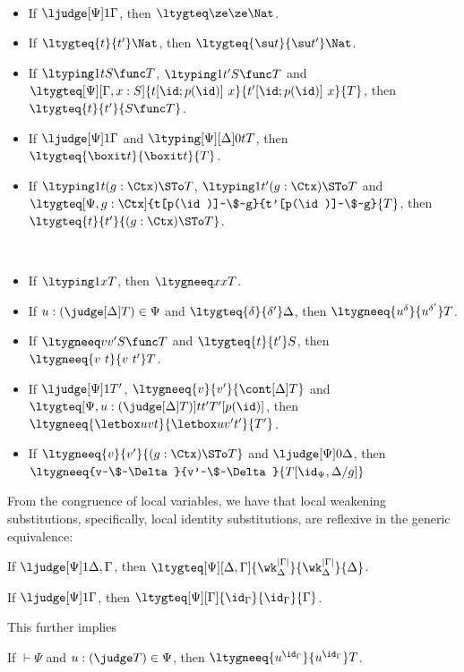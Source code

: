 \begin{law}[Congruence] $ $
  \begin{itemize}
  \item If $\ljudge[\Psi] 1 \Gamma$, then $\ltygteq \ze \ze \Nat$. 
  \item If $\ltygteq {t}{t'} \Nat$, then $\ltygteq{\su t}{\su t'} \Nat$.
  \item If $\ltyping 1 t {S \func T}$, $\ltyping 1 {t'}{S \func T}$ and
    $\ltygteq[\Psi][\Gamma, x : S]{t[\id;p(\id)]~x}{t'[\id;p(\id)]~x}{T}$, then
    $\ltygteq{t}{t'}{S \func T}$.
    
  \item If $\ljudge[\Psi] 1 \Gamma$ and $\ltyping[\Psi][\Delta] 0 t {T}$,
    then $\ltygteq{\boxit t}{\boxit t}{T}$.
    
  \item If $\ltyping 1 t {(g : \Ctx) \STo T}$, $\ltyping 1 {t'}{(g : \Ctx) \STo T}$ and
    $\ltygteq[\Psi, g : \Ctx]{t[p(\id)]~\$~g}{t'[p(\id)]~\$~g}{T}$, then
    $\ltygteq{t}{t'}{(g : \Ctx) \STo T}$.
  \end{itemize}
\end{law}

\begin{law}$ $
  \begin{itemize}
  \item If $\ltyping 1 x T$, then $\ltygneeq x x T$. 
  \item If $u : (\judge[\Delta] T) \in \Psi$ and $\ltygteq{\delta}{\delta'}\Delta$, then
    $\ltygneeq {u^{\delta}}{u^{\delta'}} T$.
  \item If $\ltygneeq v {v'}{S\func T}$ and $\ltygteq{t}{t'}S$, then
    $\ltygneeq{v~t}{v~t'}T$. 
  \item If $\ljudge[\Psi] 1 {T'}$, $\ltygneeq{v}{v'}{\cont[\Delta]T}$ and
    $\ltygteq[\Psi, u : (\judge[\Delta] T)]{t}{t'}{T'[p(\id)]}$, then
    $\ltygneeq{\letbox u v t}{\letbox u{v'}{t'}}{T'}$.
  \item If $\ltygneeq{v}{v'}{(g : \Ctx) \STo T}$ and $\ljudge[\Psi] 0 \Delta$,
    then $\ltygneeq{v~\$~\Delta}{v'~\$~\Delta}{T[\id_\Psi, \Delta/g]}$
  \end{itemize}
\end{law}

From the congruence of local variables, we have that local weakening substitutions,
specifically, local identity substitutions, are reflexive in the generic equivalence:
\begin{lemma}
  If $\ljudge[\Psi] 1 \Delta, \Gamma$, then
  $\ltygteq[\Psi][\Delta,
  \Gamma]{\wk^{|\Gamma|}_{\Delta}}{\wk^{|\Gamma|}_{\Delta}}{\Delta}$.
\end{lemma}
\begin{lemma}
  If $\ljudge[\Psi] 1 \Gamma$, then
  $\ltygteq[\Psi][\Gamma]{\id_{\Gamma}}{\id_{\Gamma}}{\Gamma}$.
\end{lemma}
This further implies
\begin{lemma}
  If $\vdash \Psi$ and $u : (\judge T) \in \Psi$, then
  $\ltygneeq {u^{\id_{\Gamma}}}{u^{\id_{\Gamma}}} T$.
\end{lemma}


